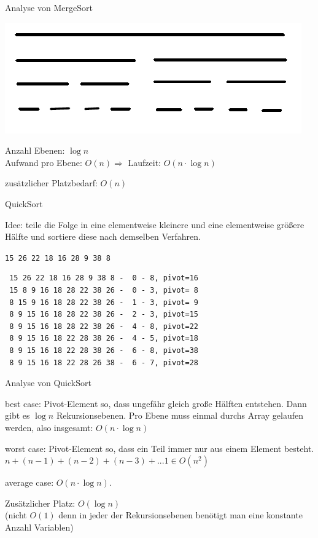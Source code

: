 \documentclass{beamer}
\begin{document}
\begin{frame}[fragile]

Analyse von MergeSort\pause

\includegraphics[scale=0.6]{mergesort1.png} 

Anzahl Ebenen: $\log n$ \\ \pause
Aufwand pro Ebene: \pause $O(n)  \Rightarrow$ Laufzeit:  \pause  $O(n \cdot \log n)$  

zusätzlicher Platzbedarf: \pause $O(n)$

\end{frame}

\begin{frame}[fragile]
QuickSort 

Idee: teile die Folge in eine elementweise kleinere und eine elementweise größere Hälfte und sortiere diese
nach demselben Verfahren. 

\texttt{15 26 22 18 16 28 9 38 8} \pause

\begin{lstlisting}
 15 26 22 18 16 28 9 38 8 -  0 - 8, pivot=16
 15 8 9 16 18 28 22 38 26 -  0 - 3, pivot= 8
 8 15 9 16 18 28 22 38 26 -  1 - 3, pivot= 9
 8 9 15 16 18 28 22 38 26 -  2 - 3, pivot=15
 8 9 15 16 18 28 22 38 26 -  4 - 8, pivot=22
 8 9 15 16 18 22 28 38 26 -  4 - 5, pivot=18
 8 9 15 16 18 22 28 38 26 -  6 - 8, pivot=38
 8 9 15 16 18 22 28 26 38 -  6 - 7, pivot=28
\end{lstlisting}

\end{frame}


\begin{frame}[fragile]

Analyse von QuickSort

best case: \pause Pivot-Element so, dass ungefähr gleich große Hälften entstehen.  
Dann gibt es $\log n$ Rekursionsebenen. 
Pro Ebene muss einmal durchs Array gelaufen werden,  also insgesamt:  $O(n \cdot \log n)$

worst case: \pause Pivot-Element so, dass ein Teil immer nur aus einem Element besteht. \\ 
$n + (n-1) + (n-2) + (n-3) + ... 1 \in O(n^2)$

average case: $O(n \cdot \log n)$. 

Zusätzlicher Platz: \pause $O(\log n)$ \\
(nicht $O(1)$ denn in jeder der Rekursionsebenen benötigt man eine konstante Anzahl Variablen)

\end{frame}
\end{document}
